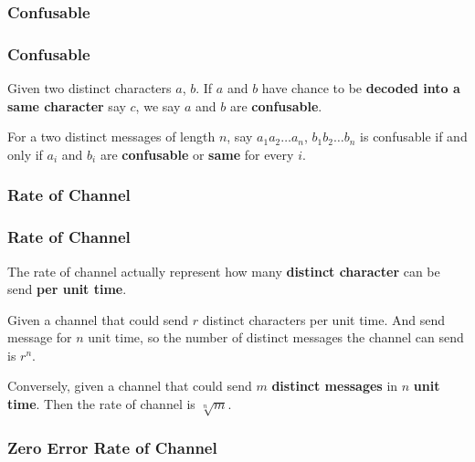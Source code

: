 \subsubsection*{Confusable}

      \begin{frame}
            \frametitle{Confusable}
            \begin{definition}[confusable]
                  Given two distinct characters $a$, $b$. If $a$ and $b$ have chance to be \textbf{decoded into a same character} say $c$, we say $a$ and $b$ are \textbf{confusable}.

                  For a two distinct messages of length $n$, say $a_{1}a_{2}\dots a_{n}$, $b_{1}b_{2}\dots b_{n}$ is confusable if and only if $a_{i}$ and $b_{i}$ are \textbf{confusable} or \textbf{same} for every $i$.
            \end{definition}
      \end{frame}

\subsubsection*{Rate of Channel}

      \begin{frame}
            \frametitle{Rate of Channel}

            \begin{definition}
                  The rate of channel actually represent how many \textbf{distinct character} can be send \textbf{per unit time}.

                  Given a channel that could send $r$ distinct characters per unit time. And send message for $n$ unit time, so the number of distinct messages the channel can send is $r^{n}$.

                  \pause

                  \vspace{0.5em}

                  Conversely, given a channel that could send $m$ \textbf{distinct messages} in $n$ \textbf{unit time}.
                  Then the rate of channel is $\sqrt[n]{m}$.
                  
            \end{definition}
      \end{frame}

\subsubsection*{Zero Error Rate of Channel}

